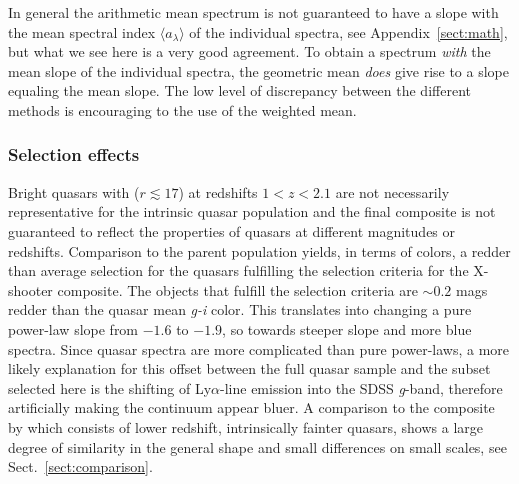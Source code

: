 \documentclass{aa}    %
\newcommand{\sectionname}{Sect.}
\newcommand{\Sect}[1]{\sectionname~\ref{sect:#1}}
\newcommand{\sect}[1]{\Sect{#1}}
\newcommand{\App}[1]{Appendix~\ref{sect:#1}}
\newcommand{\app}[1]{\App{#1}}
\newcommand{\sectlabel}[1]{\label{sect:#1}}
\newcommand{\lya}{Ly$\alpha$}
\begin{document}
In general the arithmetic mean spectrum is not guaranteed to have a
slope with the mean spectral index $\langle a_\lambda\rangle$ of the
individual spectra, see \app{math}, but what we see here is a very
good agreement. To obtain a spectrum \textit{with} the mean slope of
the individual spectra, the geometric mean \textit{does} give rise to
a slope equaling the mean slope. The low level of discrepancy between
the different methods is encouraging to the use of the weighted mean.

\subsubsection{Selection effects}  \sectlabel{Selection effects}
Bright quasars with ($r \lesssim 17$) at redshifts $1 < z < 2.1$ are
not necessarily representative for the intrinsic quasar population
\citep{Paris2014} and the final composite is not guaranteed to reflect
the properties of quasars at different magnitudes or
redshifts. Comparison to the parent population yields, in terms of
colors, a redder than average selection for the quasars fulfilling the
selection criteria for the X-shooter composite. The objects that
fulfill the selection criteria are $\sim 0.2$ mags redder than the
quasar mean \textit{g-i} color. This translates into changing a pure
power-law slope from $-1.6$ to $-1.9$, so towards steeper slope and
more blue spectra. Since quasar spectra are more complicated than pure
power-laws, a more likely explanation for this offset between the
full quasar sample and the subset selected here is the shifting of
\lya-line emission into the SDSS \textit{g}-band, therefore artificially making
the continuum appear bluer.  A comparison to the composite by
\citet{VandenBerk2001} which consists of lower redshift, intrinsically
fainter quasars, shows a large degree of similarity in the general
shape and small differences on small scales, see \sect{comparison}.
\end{document}
